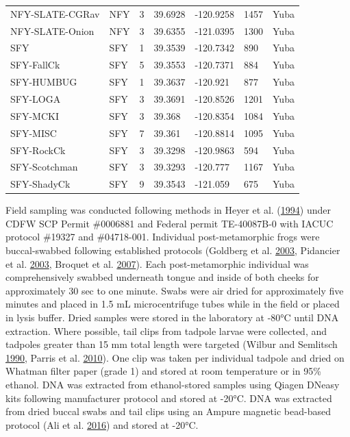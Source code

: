 \documentclass[proquest,12pt,final]{ucthesis-CA2012} %
\begin{document}
\begin{ucmainmatter}
\begin{longtable}[t]{llrllll}
\addlinespace
NFY-SLATE-CGRav & NFY & 3 & 39.6928 & -120.9258 & 1457 & Yuba\\
NFY-SLATE-Onion & NFY & 3 & 39.6355 & -121.0395 & 1300 & Yuba\\
SFY & SFY & 1 & 39.3539 & -120.7342 & 890 & Yuba\\
SFY-FallCk & SFY & 5 & 39.3553 & -120.7371 & 884 & Yuba\\
SFY-HUMBUG & SFY & 1 & 39.3637 & -120.921 & 877 & Yuba\\
\addlinespace
SFY-LOGA & SFY & 3 & 39.3691 & -120.8526 & 1201 & Yuba\\
SFY-MCKI & SFY & 3 & 39.368 & -120.8354 & 1084 & Yuba\\
SFY-MISC & SFY & 7 & 39.361 & -120.8814 & 1095 & Yuba\\
SFY-RockCk & SFY & 3 & 39.3298 & -120.9863 & 594 & Yuba\\
SFY-Scotchman & SFY & 3 & 39.3293 & -120.777 & 1167 & Yuba\\
SFY-ShadyCk & SFY & 9 & 39.3543 & -121.059 & 675 & Yuba\\*
\end{longtable}\endgroup{}
\clearpage

Field sampling was conducted following methods in Heyer et al.
(\protect\hyperlink{ref-heyer_measuring_1994}{1994}) under CDFW SCP
Permit \#0006881 and Federal permit TE-40087B-0 with IACUC protocol
\#19327 and \#04718-001. Individual post-metamorphic frogs were
buccal-swabbed following established protocols (Goldberg et al.
\protect\hyperlink{ref-goldberg_frogs_2003}{2003}, Pidancier et al.
\protect\hyperlink{ref-pidancier_buccal_2003}{2003}, Broquet et al.
\protect\hyperlink{ref-broquet_buccal_2007}{2007}). Each
post-metamorphic individual was comprehensively swabbed underneath
tongue and inside of both cheeks for approximately 30 sec to one minute.
Swabs were air dried for approximately five minutes and placed in 1.5 mL
microcentrifuge tubes while in the field or placed in lysis buffer.
Dried samples were stored in the laboratory at -80°C until DNA
extraction. Where possible, tail clips from tadpole larvae were
collected, and tadpoles greater than 15 mm total length were targeted
(Wilbur and Semlitsch
\protect\hyperlink{ref-wilbur_ecological_1990}{1990}, Parris et al.
\protect\hyperlink{ref-parris_assessing_2010}{2010}). One clip was taken
per individual tadpole and dried on Whatman filter paper (grade 1) and
stored at room temperature or in 95\% ethanol. DNA was extracted from
ethanol-stored samples using Qiagen DNeasy kits following manufacturer
protocol and stored at -20°C. DNA was extracted from dried buccal swabs
and tail clips using an Ampure magnetic bead-based protocol (Ali et al.
\protect\hyperlink{ref-ali_rad_2016}{2016}) and stored at -20°C.


\end{ucmainmatter}
\end{document}
